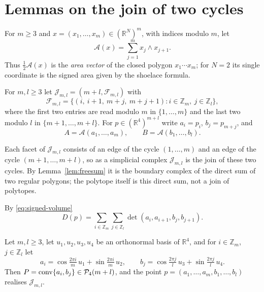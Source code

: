 \section{Lemmas on the join of two cycles}
\label{sec:lemmas}

For $m \geq 3$ and $x = (x_{1}, \ldots, x_{m}) \in (\mathbb{R}^{N})^{m}$, with
indices modulo $m$, let
\begin{equation}
  \label{eq:areavector}
  \mathcal{A}(x) = \sum_{j=1}^{m} x_{j} \wedge x_{j+1}.
\end{equation}
Thus $\frac12\mathcal{A}(x)$ is the \emph{area vector} of the closed polygon
$x_{1} \cdots x_{m}$; for $N = 2$ its single coordinate is the signed area given
by the shoelace formula.

\begin{definition}
  \label{def:join}
  For $m, l \geq 3$ let $\mathcal{J}_{m,l} = (m + l, \mathcal{F}_{m,l})$ with
  \[
    \mathcal{F}_{m,l} = \bigl\{(i,\ i+1,\ m+j,\ m+j+1) : i \in \mathbb{Z}_{m},\
      j \in \mathbb{Z}_{l}\bigr\},
  \]
  where the first two entries are read modulo $m$ in $\{1, \ldots, m\}$ and the
  last two modulo $l$ in $\{m+1, \ldots, m+l\}$. For
  $p \in (\mathbb{R}^{4})^{m+l}$ write $a_{i} = p_{i}$, $b_{j} = p_{m+j}$, and
  \[
    A = \mathcal{A}(a_{1}, \ldots, a_{m}), \qquad
    B = \mathcal{A}(b_{1}, \ldots, b_{l}).
  \]
\end{definition}

Each facet of $\mathcal{J}_{m,l}$ consists of an edge of the cycle $(1, \ldots,
m)$ and an edge of the cycle $(m+1, \ldots, m+l)$, so as a simplicial complex
$\mathcal{J}_{m,l}$ is the join of these two cycles. By
Lemma~\ref{lem:freesum} it is the boundary complex of the direct sum of two
regular polygons; the polytope itself is this direct sum, not a join of
polytopes.

By \eqref{eq:signed-volume}
\begin{equation}
  \label{eq:Djoin}
  D(p) = \sum_{i \in \mathbb{Z}_{m}}\sum_{j \in \mathbb{Z}_{l}}
    \det(a_{i}, a_{i+1}, b_{j}, b_{j+1}).
\end{equation}

\begin{lemma}
  \label{lem:freesum}
  Let $m, l \geq 3$, let $u_{1}, u_{2}, u_{3}, u_{4}$ be an orthonormal basis of
  $\mathbb{R}^{4}$, and for $i \in \mathbb{Z}_{m}$, $j \in \mathbb{Z}_{l}$ let
  \[
    a_{i} = \cos\tfrac{2\pi i}{m}\,u_{1} + \sin\tfrac{2\pi i}{m}\,u_{2}, \qquad
    b_{j} = \cos\tfrac{2\pi j}{l}\,u_{3} + \sin\tfrac{2\pi j}{l}\,u_{4}.
  \]
  Then $P = \operatorname{conv}\{a_{i}, b_{j}\} \in \mathcal{P}_{4}(m + l)$, and the point
  $p = (a_{1}, \ldots, a_{m}, b_{1}, \ldots, b_{l})$ realises
  $\mathcal{J}_{m,l}$.
\end{lemma}

